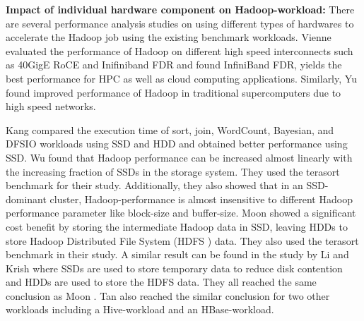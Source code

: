 \documentclass[conference]{IEEEtran}
\begin{document}

\textbf{Impact of individual hardware component on Hadoop-workload:}
There are several performance analysis studies on using different types of hardwares to accelerate the Hadoop job using the existing benchmark workloads. 
Vienne \cite{ethib:vienne} evaluated the performance of Hadoop on different high speed interconnects such as 40GigE RoCE and Inifiniband FDR and found InfiniBand FDR, yields the best performance for HPC as well as cloud computing applications. 
Similarly, Yu \cite{ethib:yu} found improved performance of Hadoop in traditional supercomputers due to high speed networks. 

Kang \cite{ssdhdd:kang} compared the execution time of sort, join, WordCount, Bayesian, and DFSIO workloads using SSD and HDD and obtained better performance using SSD. 
Wu \cite{ssdhdd:wu} found that Hadoop performance can be increased almost linearly with the increasing fraction of SSDs in the storage system. They used the terasort benchmark for their study. Additionally, they also showed that in an SSD-dominant cluster, Hadoop-performance is almost insensitive to different Hadoop performance parameter like block-size and buffer-size. 
Moon \cite{ssdhdd:moon} showed a significant cost benefit by storing the intermediate Hadoop data in SSD, leaving HDDs to store Hadoop Distributed File System (HDFS \cite{fw:hdfs}) data. They also used the terasort benchmark in their study. 
A similar result can be found in the study by Li \cite{ssdhdd:li} and Krish \cite{ssdhdd:krish} where SSDs are used to store temporary data to reduce disk contention and HDDs are used to store the HDFS data. They all reached the same conclusion as Moon \cite{ssdhdd:moon}.  
Tan \cite{ssdhdd:tan} also reached the similar conclusion for two other workloads including a Hive-workload and an HBase-workload. 
\end{document}
